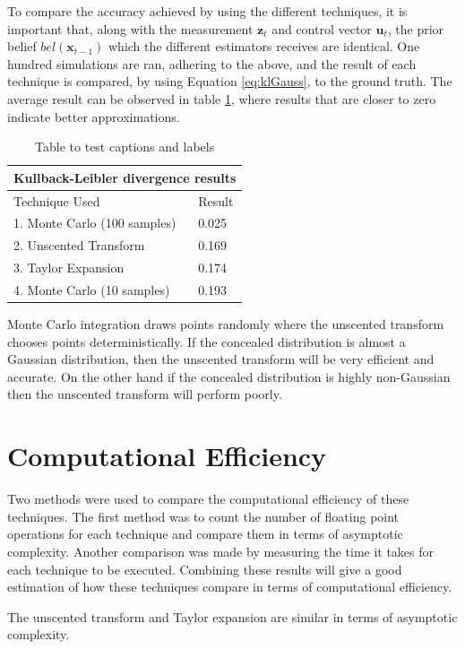 \documentclass[12pt,oneside,openany,a4paper, %
afrikaans,english,
]{memoir}
\numberwithin{equation}{chapter}
\begin{document}
To compare the accuracy achieved by using the different techniques, it is important that, along with the measurement $\bm{z}_t$ and control vector $\bm{u}_t$, the prior belief $bel(\bm{x}_{t-1})$ which the different estimators receives are identical. One hundred simulations are ran, adhering to the above, and the result of each technique is compared, by using Equation \ref{eq:klGauss}, to the ground truth. The average result can be observed in table \ref{table:kl}, where results that are closer to zero indicate better approximations.

\begin{table}[H]
\center
\begin{tabular}{ |p{6cm}||p{3cm}|}
 \hline
 \multicolumn{2}{|c|}{Kullback-Leibler divergence results} \\
 \hline
 Technique Used & Result\\
 \hline
 1. Monte Carlo (100 samples)   & 0.025\\
 2. Unscented Transform  &  0.169\\
 3. Taylor Expansion &  0.174\\
 4. Monte Carlo (10 samples) & 0.193\\
 \hline
\end{tabular}
\caption{Table to test captions and labels}
\label{table:kl}
\end{table}
Monte Carlo integration draws points randomly where the unscented transform chooses points deterministically. If the concealed distribution is almost a Gaussian distribution, then the unscented transform will be very efficient and accurate. On the other hand if the concealed distribution is highly non-Gaussian then the unscented transform will perform poorly.

\section{Computational Efficiency}
Two methods were used to compare the computational efficiency of these techniques. The first method was to count the number of floating point operations for each technique and compare them in terms of asymptotic complexity. Another comparison was made by measuring the time it takes for each technique to be executed. Combining these results will give a good estimation of how these techniques compare in terms of computational efficiency.

The unscented transform and Taylor expansion are similar in terms of asymptotic complexity.
\end{document}
